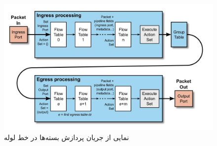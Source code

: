 \subsection{}

\begin{figure}
	\centering
	\includegraphics[scale=0.5]{imgs/pkt_flow.jpg}
	\caption{نمایی از جریان پردازش بسته‌ها در خط لوله \cite{spec}}
	\label{fig5}
\end{figure}

